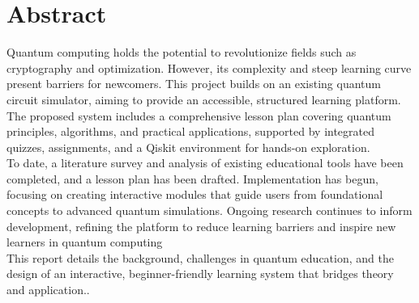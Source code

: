 \chapter*{\Large \center Abstract}

Quantum computing holds the potential to revolutionize fields such as cryptography and optimization. However, its complexity and steep learning curve present barriers for newcomers. This project builds on an existing quantum circuit simulator, aiming to provide an accessible, structured learning platform. The proposed system includes a comprehensive lesson plan covering quantum principles, algorithms, and practical applications, supported by integrated quizzes, assignments, and a Qiskit environment for hands-on exploration. \\

To date, a literature survey and analysis of existing educational tools have been completed, and a lesson plan has been drafted. Implementation has begun, focusing on creating interactive modules that guide users from foundational concepts to advanced quantum simulations. Ongoing research continues to inform development, refining the platform to reduce learning barriers and inspire new learners in quantum computing\\

This report details the background, challenges in quantum education, and the design of an interactive, beginner-friendly learning system that bridges theory and application..